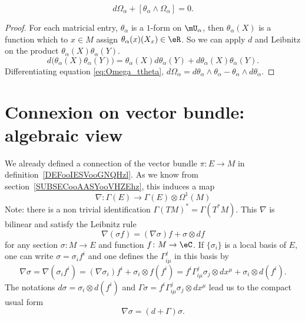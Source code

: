 \begin{lemma}
	\[
		d\Omega_{\alpha}+[\theta_{\alpha}\wedge\Omega_{\alpha}]=0.
	\]
\end{lemma}

\begin{proof}
	For each matricial entry, $\theta_{\alpha}$ is a $1$-form on $\mU_{\alpha}$, then $\theta_{\alpha}(X)$ is a function which to $x\in M$ assign $\theta_{\alpha}(x)(X_x)\in\eR$. So we can apply $d$ and Leibnitz on the product $\theta_{\alpha}(X)\theta_{\alpha}(Y)$.
	\[
		d\big(  \theta_{\alpha}(X)\theta_{\alpha}(Y)  \big)=\theta_{\alpha}(X)d\theta_{\alpha}(Y)+d\theta_{\alpha}(X)\theta_{\alpha}(Y).
	\]
	Differentiating equation \eqref{eq:Omega_ttheta}, $d\Omega_{\alpha}=d\theta_{\alpha}\wedge\theta_{\alpha}-\theta_{\alpha}\wedge d\theta_{\alpha}$.
\end{proof}

\section{Connexion on vector bundle: algebraic view}

We already defined a connection of the vector bundle \( \pi\colon E\to M\) in definition~\ref{DEFooIESVooGNQHzl}. As we know from section~\ref{SUBSECooAASYooVHZEhz}, this induces a map
\begin{equation}        \label{EQooBRLHooJgzIyT}
	\nabla\colon \Gamma(E)\to \Gamma(E)\otimes \Omega^1(M)
\end{equation}
Note: there is a non trivial identification \( \Gamma(TM)^*=\Gamma(T^*M)\). This \( \nabla\) is bilinear and satisfy the Leibnitz rule
\begin{equation}
	\nabla(\sigma f)=(\nabla\sigma)f+\sigma\otimes df
\end{equation}
for any section $\sigma\colon M\to E$ and function $f\colon M\to \eC$. If $\{ \sigma_i \}$ is a local basis of $E$, one can write $\sigma=\sigma_if^i$ and one defines the  $\Gamma_{i\mu}^{j}$ in this basis by
\begin{equation}
	\nabla \sigma=\nabla (\sigma_if^i)
	=(\nabla \sigma_i)f^i+\sigma_i\otimes f(f^i)
	=f^i\Gamma_{i\mu}^{j}\sigma_j\otimes dx^{\mu}+\sigma_i\otimes d(f^i).
\end{equation}
The notations $d\sigma=\sigma_i\otimes d(f^i)$ and $\Gamma\sigma=f^i\Gamma_{i\mu}^{j}\sigma_j\otimes dx^{\mu}$ lead us to the compact usual form
\[
	\nabla\sigma=(d+\Gamma)\sigma.
\]

